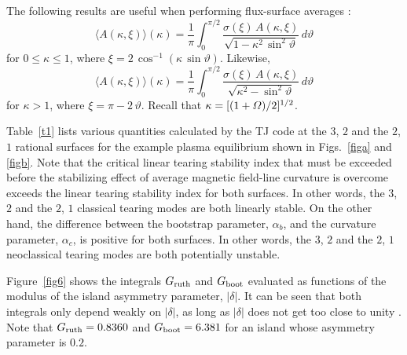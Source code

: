 \documentclass{iopjournal}
\begin{document}
{ The following results are useful when performing flux-surface averages \cite{island}:
\begin{equation}
\langle A(\kappa,\xi)\rangle(\kappa) = \frac{1}{\pi}\int_0^{\pi/2}\frac{\sigma(\xi)\,A(\kappa,\xi)}{\sqrt{1-\kappa^2\,\sin^2\vartheta}}\,d\vartheta
\end{equation}
for $0\leq \kappa\leq 1$, where $\xi=2\,\cos^{-1}(\kappa\,\sin\vartheta)$. Likewise, 
\begin{equation}
\langle A(\kappa,\xi)\rangle(\kappa) = \frac{1}{\pi}\int_0^{\pi/2}\frac{\sigma(\xi)\,A(\kappa,\xi)}{\sqrt{\kappa^2-\sin^2\vartheta}}\,d\vartheta
\end{equation}
for $\kappa>1$, where $\xi=\pi-2\,\vartheta$. Recall that $\kappa=[(1+{\mit\Omega})/2]^{1/2}$. 

Table~\ref{t1} lists various quantities calculated by the TJ code at the $3$, $2$ and the $2$, $1$ rational surfaces for the example plasma equilibrium shown in Figs.~\ref{figa} and \ref{figb}. 
Note that the critical linear tearing stability index that must be exceeded before the stabilizing effect of average magnetic field-line curvature is overcome \cite{tear10} exceeds the linear tearing stability index for both surfaces. In other words, the $3$, $2$ and the $2$, $1$ classical tearing modes are both linearly stable. On the other hand, the difference between the bootstrap parameter, $\alpha_b$, and the curvature parameter, $\alpha_c$, is positive
for both surfaces. In other words, the $3$, $2$ and the $2$, $1$ neoclassical tearing modes  are both potentially unstable. 

Figure~\ref{fig6} shows the integrals $G_{\rm ruth}$ and $G_{\rm boot}$ evaluated as functions of the modulus of the island asymmetry
parameter, $|\delta|$. It can be seen that both integrals only depend weakly on $|\delta|$, as long as $|\delta|$ does not get too close to
unity \cite{ece6,island}. Note that $G_{\rm ruth} = 0.8360$ and $G_{\rm boot} =6.381$ for an island whose asymmetry parameter is $0.2$. 
 
}
\end{document}
